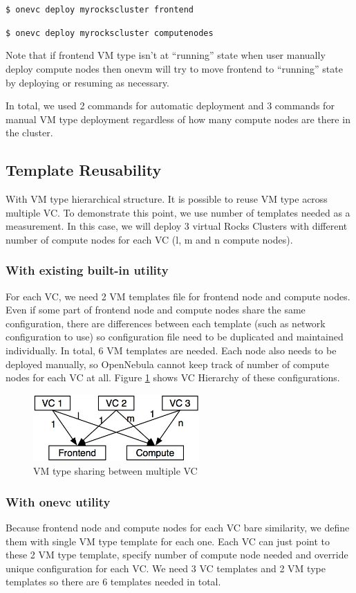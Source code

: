 \documentclass[conference]{IEEEtran}
\begin{document}
\texttt{\$ onevc deploy myrockscluster frontend}

\texttt{\$ onevc deploy myrockscluster computenodes}

Note that if frontend VM type isn't at ``running'' state when user manually deploy compute nodes then onevm will try to move frontend to ``running'' state by deploying or resuming as necessary.

In total, we used 2 commands for automatic deployment and 3 commands for manual VM type deployment regardless of how many compute nodes are there in the cluster.

\subsection{Template Reusability}
With VM type hierarchical structure.
It is possible to reuse VM type across multiple VC.
To demonstrate this point, we use number of templates needed as a measurement.
In this case, we will deploy 3 virtual Rocks Clusters\cite{CPE:CPE722} with different number of compute nodes for each VC (l, m and n compute nodes).

\subsubsection{With existing built-in utility}
For each VC, we need 2 VM templates file for frontend node and compute nodes.
Even if some part of frontend node and compute nodes share the same configuration, there are differences between each template (such as network configuration to use) so configuration file need to be duplicated and maintained individually.
In total, 6 VM templates are needed.
Each node also needs to be deployed manually, so OpenNebula cannot keep track of number of compute nodes for each VC at all.
Figure \ref{fig:vmtypeshare} shows VC Hierarchy of these configurations.

\begin{figure}[!t]
\centering
\includegraphics[width=2.5in]{vmtypeshare}
\caption{VM type sharing between multiple VC}
\label{fig:vmtypeshare}
\end{figure}

\subsubsection{With onevc utility}
Because frontend node and compute nodes for each VC bare similarity, we define them with single VM type template for each one.
Each VC can just point to these 2 VM type template, specify number of compute node needed and override unique configuration for each VC.
We need 3 VC templates and 2 VM type templates so there are 6 templates needed in total.
\end{document}
